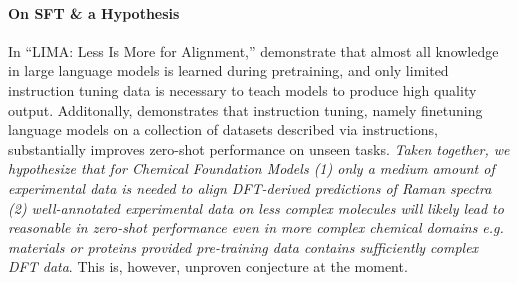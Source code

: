 \documentclass[10pt]{article}
\begin{document}
\paragraph{On SFT \& a Hypothesis} In ``LIMA: Less Is More for Alignment,'' \citet{zhou2023lima} demonstrate that almost all knowledge in large
language models is learned during pretraining, and only limited instruction tuning data is necessary to teach models to produce high quality output. Additonally, \citet{wei2022finetuned} demonstrates that instruction tuning, namely finetuning language models on a collection of datasets described via instructions, substantially improves zero-shot performance on unseen tasks. \textit{Taken together, we hypothesize that for Chemical Foundation Models (1) only a medium amount of experimental data is needed to align DFT-derived predictions of Raman spectra (2) well-annotated experimental data on less complex molecules will likely lead to reasonable in zero-shot performance even in more complex chemical domains e.g. materials or proteins provided pre-training data contains sufficiently complex DFT data}. This is, however, unproven conjecture at the moment.
\end{document}

